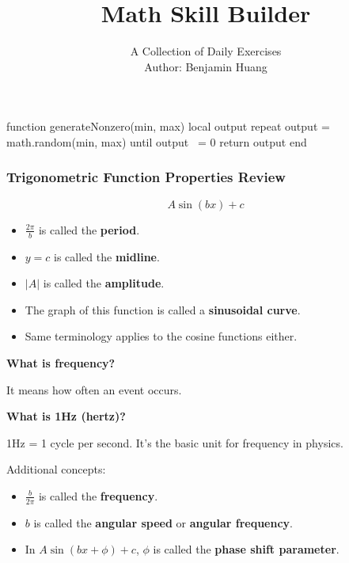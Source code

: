 \documentclass[10pt]{beamer}
\author[B.H.]{{\Large A Collection of Daily Exercises}\\\vspace{.5em} Author: Benjamin Huang}
\date{}
\title[Skill Builder]{Math Skill Builder}
\begin{document}
\begin{luacode*}
function generateNonzero(min, max)
  local output
  repeat
    output = math.random(min, max)
  until output ~= 0
  return output
end
\end{luacode*}
\frame{\titlepage}
\begin{frame}
\frametitle{Trigonometric Function Properties Review}
\[
A\sin(bx) + c
\]
\begin{figure}
\end{figure}
\pause
\begin{itemize}
\item
$\displaystyle \frac{2\pi}{b}$ is called the \textbf{period}.\pause
\item
$y = c$ is called the \textbf{midline}.\pause
\item
$\lvert A\rvert$ is called the \textbf{amplitude}.\pause
\item
The graph of this function is called a \textbf{sinusoidal curve}.\pause
\item 
Same terminology applies to the cosine functions either.\pause

\end{itemize}
\end{frame}
\begin{frame}
\textbf{What is frequency?}\pause

It means how often an event occurs.\pause

\textbf{What is 1Hz (hertz)?}\pause

1Hz = 1 cycle per second. It's the basic unit for frequency in physics.\pause

Additional concepts:\pause
\begin{itemize}
\item
$\displaystyle \frac{b}{2\pi}$ is called the \textbf{frequency}.\pause
\item
$b$ is called the \textbf{angular speed} or \textbf{angular frequency}.\pause
\item In $A\sin(bx + \phi) + c$, $\phi$ is called the \textbf{phase shift parameter}.
\end{itemize}
\end{frame}
\end{document}
